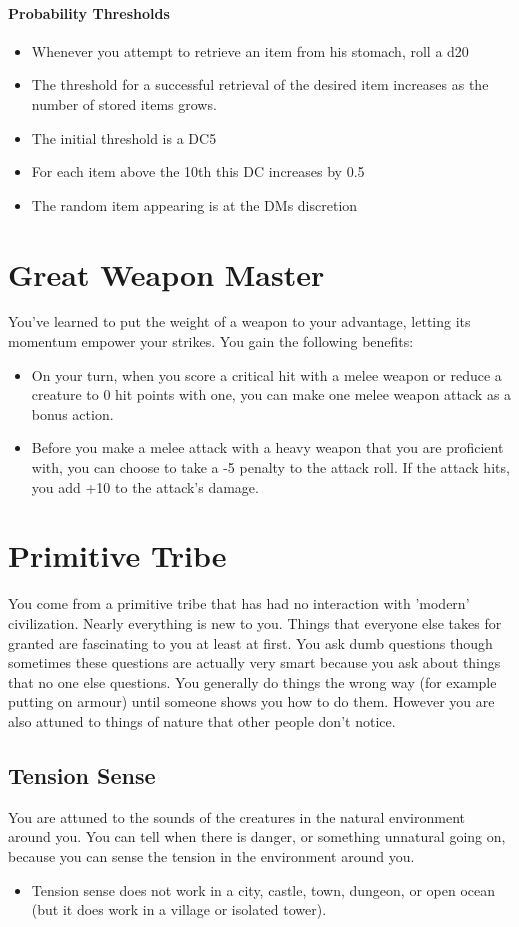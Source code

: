 {\paragraph*{Probability Thresholds}
\begin{itemize}
	\item Whenever you attempt to retrieve an item from his stomach, roll a d20
	\item The threshold for a successful retrieval of the desired item increases as the number of stored items grows.
	\item The initial threshold is a DC5
	\item For each item above the 10th this DC increases by 0.5
	\item The random item appearing is at the DMs discretion
\end{itemize}

\section*{Great Weapon Master}
You've learned to put the weight of a weapon to your advantage, letting its momentum empower your strikes. You gain the following benefits:
\begin{itemize}
	\item On your turn, when you score a critical hit with a melee weapon or reduce a creature to 0 hit points with one, you can make one melee weapon attack as a bonus action.
	\item Before you make a melee attack with a heavy weapon that you are proficient with, you can choose to take a -5 penalty to the attack roll. If the attack hits, you add +10 to the attack's damage.
\end{itemize}

\section*{Primitive Tribe}
You come from a primitive tribe that has had no interaction with 'modern' civilization. Nearly everything is new to you. Things that everyone else takes for granted are fascinating to you at least at first. You ask dumb questions though sometimes these questions are actually very smart because you ask about things that no one else questions. You generally do things the wrong way (for example putting on armour) until someone shows you how to do them. However you are also attuned to things of nature that other people don't notice.
\subsection*{Tension Sense}
You are attuned to the sounds of the creatures in the natural environment around you. You can tell when there is danger, or something unnatural going on, because you can sense the tension in the environment around you.
\begin{itemize}
	\item Tension sense does not work in a city, castle, town, dungeon, or open ocean (but it does work in a village or isolated tower).
\end{itemize}

}

